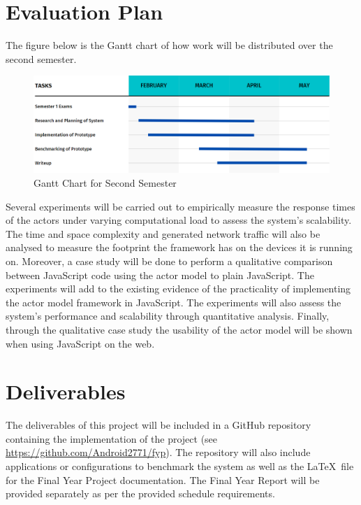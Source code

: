 \documentclass[12pt]{report}
\begin{document}
\section{Evaluation Plan}
The figure below is the Gantt chart of how work will be distributed over the second semester.
\begin{figure}[H]
\includegraphics[width=\textwidth]{gantt.png}
\caption{Gantt Chart for Second Semester}
\centering
\end{figure}
Several experiments will be carried out to empirically measure the response times of the actors under varying computational load to assess the system’s scalability. The time and space complexity and generated network traffic will also be analysed to measure the footprint the framework has on the devices it is running on. Moreover, a case study will be done to perform a qualitative comparison between JavaScript code using the actor model to plain JavaScript. The experiments will add to the existing evidence of the practicality of implementing the actor model framework in JavaScript. The experiments will also assess the system's performance and scalability through quantitative analysis. Finally, through the qualitative case study the usability of the actor model will be shown when using JavaScript on the web.
\section{Deliverables}
The deliverables of this project will be included in a GitHub repository containing the implementation of the project (see \url{https://github.com/Android2771/fyp}). The repository will also include applications or configurations to benchmark the system as well as the \LaTeX~file for the Final Year Project documentation. The Final Year Report will be provided separately as per the provided schedule requirements.

  
\end{document}
